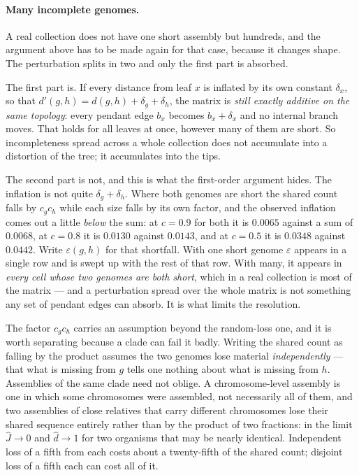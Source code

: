\documentclass[pdflatex,sn-vancouver-num]{sn-jnl}
\begin{document}
\paragraph{Many incomplete genomes.} A real collection does not have one short assembly but
hundreds, and the argument above has to be made again for that case, because it changes shape. The
perturbation splits in two and only the first part is absorbed.

The first part is. If every distance from leaf $x$ is inflated by its own constant $\delta_x$, so
that $d'(g,h) = d(g,h) + \delta_g + \delta_h$, the matrix is \emph{still exactly additive on the same
topology}: every pendant edge $b_x$ becomes $b_x + \delta_x$ and no internal branch moves. That holds
for all leaves at once, however many of them are short. So incompleteness spread across a whole
collection does not accumulate into a distortion of the tree; it accumulates into the tips.

The second part is not, and this is what the first-order argument hides. The inflation is not quite
$\delta_g + \delta_h$. Where both genomes are short the shared count falls by $c_g c_h$ while each
size falls by its own factor, and the observed inflation comes out a little \emph{below} the sum: at
$c = 0.9$ for both it is $0.0065$ against a sum of $0.0068$, at $c = 0.8$ it is $0.0130$ against
$0.0143$, and at $c = 0.5$ it is $0.0348$ against $0.0442$. Write $\varepsilon(g,h)$ for that
shortfall. With one short genome $\varepsilon$ appears in a single row and is swept up with the rest
of that row. With many, it appears in \emph{every cell whose two genomes are both short}, which in a
real collection is most of the matrix --- and a perturbation spread over the whole matrix is not
something any set of pendant edges can absorb. It is what limits the resolution.

The factor $c_g c_h$ carries an assumption beyond the random-loss one, and it is worth separating
because a clade can fail it badly. Writing the shared count as falling by the product assumes the two
genomes lose material \emph{independently} --- that what is missing from $g$ tells one nothing about
what is missing from $h$. Assemblies of the same clade need not oblige. A chromosome-level assembly is
one in which some chromosomes were assembled, not necessarily all of them, and two assemblies of close
relatives that carry different chromosomes lose their shared sequence entirely rather than by the
product of two fractions: in the limit $\widehat{J} \to 0$ and $\widehat{d} \to 1$ for two organisms
that may be nearly identical. Independent loss of a fifth from each costs about a twenty-fifth of the
shared count; disjoint loss of a fifth each can cost all of it.
\end{document}
